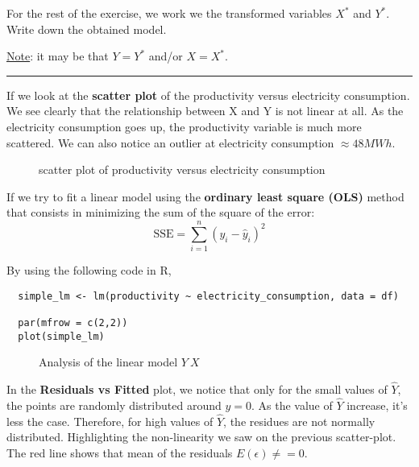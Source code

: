 \documentclass[10pt, a4paper, nofootinbib]{scrartcl}
\begin{document}
For the rest of the exercise, we work we the transformed variables $X^{\ast}$ and $Y^{\ast}$. 
Write down the obtained model.

\underline{Note}: it may be that $Y = Y^{\ast}$ and/or $X = X^{\ast}$.

\begin{center}\rule{6cm}{0.4pt}\end{center}

If we look at the \textbf{scatter plot} of the productivity versus electricity consumption. We see clearly that the relationship between X and Y is not linear at all. As the electricity consumption goes up, the productivity variable is much more scattered. We can also notice an outlier at electricity consumption $\approx 48MWh$.

\begin{figure}[H]
  \centering
  
  \caption{scatter plot of productivity versus electricity consumption}
  \label{fig:scatter_plot}
\end{figure}

If we try to fit a linear model using the \textbf{ordinary least square (OLS)} method that consists in minimizing the sum of the square of the error: 
\begin{equation}
  \text{SSE} = \sum_{i = 1}^{n} (y_i - \hat{y}_i)^2
\end{equation}

By using the following code in R, 
\begin{verbatim}
  simple_lm <- lm(productivity ~ electricity_consumption, data = df)

  par(mfrow = c(2,2))
  plot(simple_lm)
\end{verbatim}

\begin{figure}[H]
  \centering
  
  \caption{Analysis of the linear model $Y ~ X$}
  \label{fig:analysis-linear-model}
\end{figure}

In the \textbf{Residuals vs Fitted} plot, we notice that only for the small values of $\hat{Y}$, the points are randomly distributed around $y = 0$. As the value of $\hat{Y}$ increase, it's less the case. Therefore, for high values of $\hat{Y}$, the residues are not normally distributed. Highlighting the non-linearity we saw on the previous scatter-plot. The red line shows that mean of the residuals $E(\epsilon) \neq = 0$.
\end{document}

